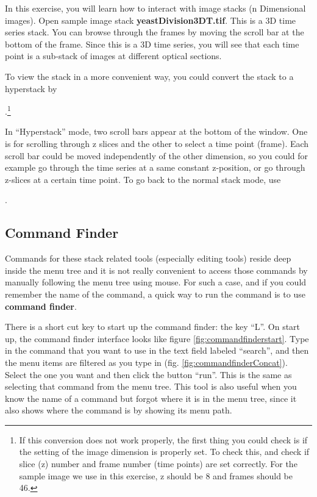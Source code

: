 \begin{indentexercise}{2}
  In this exercise, you will learn how to interact with image stacks (n
  Dimensional images).
  Open sample image stack \textbf{yeastDivision3DT.tif}.
  This is a 3D time series stack. You can browse through the frames by moving
  the scroll bar at the bottom of the frame.
  Since this is a 3D time series, you will see that each time point is a
  sub-stack of images at different optical sections. 
  
  To view the stack in a more
  convenient way, you could convert the stack to a hyperstack by 
  
  .\footnote{If this conversion does not work properly, the first thing you could
  check is if the setting of the image dimension is properly set.
  To check this,  and check if slice (z)
  number and frame number (time points) are set correctly.
  For the sample image we use in this exercise, z should be 8 and frames should
  be 46.}
  
   In ``Hyperstack'' mode, two scroll bars appear at the bottom of the
   window. One is for scrolling through z slices and the other to select a time point (frame).
   Each scroll bar could be moved independently of the other dimension, so you
   could for example go through the time series at a same constant z-position,
   or go through z-slices at a certain time point.
   To go back to the normal stack mode, use 
   
   .
\end{indentexercise}

\subsection{Command Finder}

Commands for these stack related tools (especially editing tools) reside deep inside the menu tree and it is not really convenient to access those commands by manually following the menu tree using mouse. For such a case, and if you could remember the name of the command, a quick way to run the command is to use \textbf{command finder}.

There is a short cut key to start up the command finder: the key ``L''. On start up, the command finder interface looks like figure \ref{fig:commandfinderstart}. Type in the command that you want to use in the text field labeled ``search'', and then the menu items are filtered as you type in (fig. \ref{fig:commandfinderConcat}). Select the one you want and then click the button ``run''. This is the same as selecting that command from the menu tree. This tool is also useful when you know the name of a command but forgot where it is in the menu tree, since it also shows where the command is by showing its menu path. 

